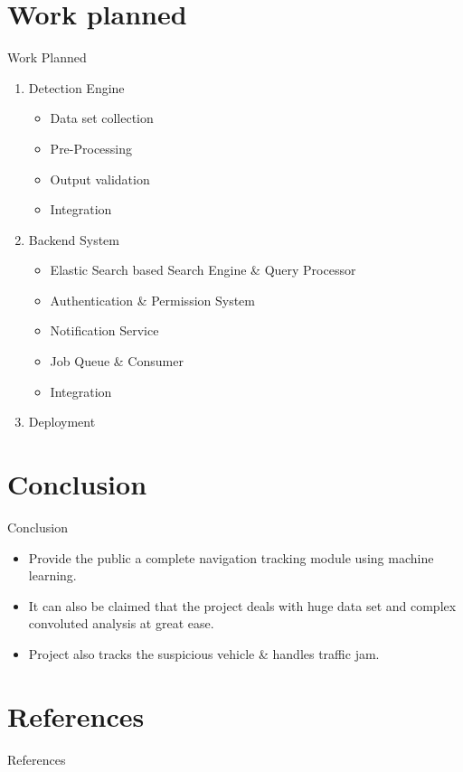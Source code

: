 \documentclass{beamer}
\begin{document}

\section{Work planned}
\begin{frame}{Work Planned}
\begin{enumerate}
	\item Detection Engine
		\begin{itemize}
			\item Data set collection
			\item Pre-Processing
			\item Output validation
			\item Integration
		\end{itemize}
	\item Backend System
		\begin{itemize}
			\item Elastic Search based Search Engine \& Query Processor 
			\item Authentication \& Permission System
			\item Notification Service
			\item Job Queue \& Consumer 
			\item Integration
		\end{itemize}
    \item Deployment
    

\end{enumerate}
\end{frame}


\section{Conclusion}
\begin{frame}{Conclusion}
\begin{itemize}
    \item Provide the public a complete navigation tracking module  using machine learning.
    \item It can also be claimed that the project deals with huge data set and complex convoluted analysis at great ease.
    \item Project also tracks the suspicious vehicle \&
    handles traffic jam.
\end{itemize}
\end{frame}


\section{References}
\begin{frame}{References}
	\nocite{*}
	
	
\end{frame}

\end{document}
